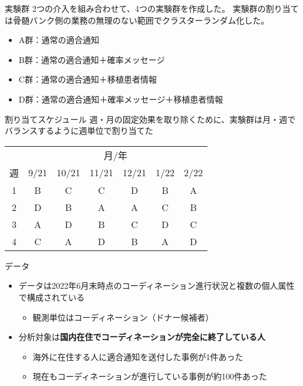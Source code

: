\documentclass[
      aspectratio=169,
        12pt,
    ]{beamer}
\renewcommand{\textbf}[1]{{\color{DarkBlue}\bfseries#1}}
\providecommand{\tightlist}{%
  \setlength{\itemsep}{0pt}\setlength{\parskip}{0pt}}
\begin{document}
\begin{frame}{実験群}
\protect\hypertarget{ux5b9fux9a13ux7fa4}{}
2つの介入を組み合わせて、4つの実験群を作成した。
実験群の割り当ては骨髄バンク側の業務の無理のない範囲でクラスターランダム化した。

\begin{itemize}
\tightlist
\item
  A群：通常の適合通知
\item
  B群：通常の適合通知＋確率メッセージ
\item
  C群：通常の適合通知＋移植患者情報
\item
  D群：通常の適合通知＋確率メッセージ＋移植患者情報
\end{itemize}
\end{frame}

\begin{frame}{割り当てスケジュール}
\protect\hypertarget{ux5272ux308aux5f53ux3066ux30b9ux30b1ux30b8ux30e5ux30fcux30eb}{}
週・月の固定効果を取り除くために、実験群は月・週でバランスするように週単位で割り当てた

\begin{table}
\centering
\begin{tabular}[t]{ccccccc}
\toprule
\multicolumn{1}{c}{ } & \multicolumn{6}{c}{月/年} \\
\cmidrule(l{3pt}r{3pt}){2-7}
週 & 9/21 & 10/21 & 11/21 & 12/21 & 1/22 & 2/22\\
\midrule
1 & B & C & C & D & B & A\\
2 & D & B & A & A & C & B\\
3 & A & D & B & C & D & C\\
4 & C & A & D & B & A & D\\
\bottomrule
\end{tabular}
\end{table}
\end{frame}

\begin{frame}{データ}
\protect\hypertarget{ux30c7ux30fcux30bf}{}
\begin{itemize}
\tightlist
\item
  データは2022年6月末時点のコーディネーション進行状況と複数の個人属性で構成されている

  \begin{itemize}
  \tightlist
  \item
    観測単位はコーディネーション（ドナー候補者）
  \end{itemize}
\item
  分析対象は\textbf{国内在住でコーディネーションが完全に終了している人}

  \begin{itemize}
  \tightlist
  \item
    海外に在住する人に適合通知を送付した事例が1件あった
  \item
    現在もコーディネーションが進行している事例が約100件あった
  \end{itemize}
\end{itemize}
\end{frame}
\end{document}
